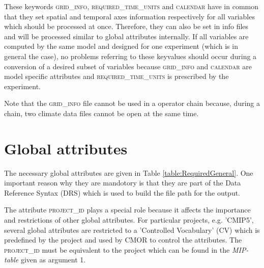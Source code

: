 These keywords \textsc{grid\_info}, \textsc{required\_time\_units} and \textsc{calendar} have in common that they set spatial and temporal axes information respectively for all variables which should be processed at once. Therefore, they can also be set in info files and will be processed similar to global attributes internally. If all variables are computed by the same model and designed for one experiment (which is in general the case), no problems referring to these keyvalues should occur during a conversion of a desired subset of variables because \textsc{grid\_info} and \textsc{calendar} are model specific attributes and \textsc{required\_time\_units} is prescribed by the experiment.

Note that the \textsc{grid\_info} file cannot be used in a operator chain because, during a chain, two climate data files cannot be open at the same time. 

\section{Global attributes}

The necessary global attributes are given in Table \ref{table:RequiredGeneral}. One important reason why they are mandotory is that they are part of the Data Reference Syntax (DRS) which is used to build the file path for the output.

The attribute \textsc{project\_id} plays a special role because it affects the importance and restrictions of other global attributes. For particular projects, e.g. 'CMIP5', several global attributes are restricted to a 'Controlled Vocabulary' (CV) which is predefined by the project and used by CMOR to control the attributes. The \textsc{project\_id} must be equivalent to the project which can be found in the \textit{MIP-table} given as argument 1.

